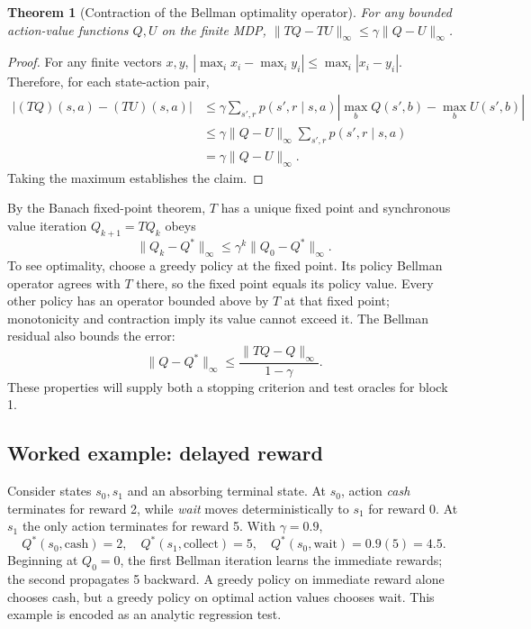 \documentclass[11pt,a4paper]{article}
\newtheorem{theorem}{Theorem}
\begin{document}
\begin{theorem}[Contraction of the Bellman optimality operator]
For any bounded action-value functions $Q,U$ on the finite MDP, $\|TQ-TU\|_\infty\leq\gamma\|Q-U\|_\infty$.
\end{theorem}
\begin{proof}
For any finite vectors $x,y$, $|\max_i x_i-\max_i y_i|\leq\max_i|x_i-y_i|$. Therefore, for each state-action pair,
\begin{align*}
 |(TQ)(s,a)-(TU)(s,a)|
 &\leq\gamma\sum_{s',r}p(s',r\mid s,a)\left|\max_bQ(s',b)-\max_bU(s',b)\right|\\
 &\leq\gamma\|Q-U\|_\infty\sum_{s',r}p(s',r\mid s,a)\\
 &=\gamma\|Q-U\|_\infty.
\end{align*}
Taking the maximum establishes the claim.
\end{proof}
By the Banach fixed-point theorem, $T$ has a unique fixed point and synchronous value iteration $Q_{k+1}=TQ_k$ obeys
\[
 \|Q_k-Q^*\|_\infty\leq\gamma^k\|Q_0-Q^*\|_\infty.
\]
To see optimality, choose a greedy policy at the fixed point. Its policy Bellman operator agrees with $T$ there, so the fixed point equals its policy value. Every other policy has an operator bounded above by $T$ at that fixed point; monotonicity and contraction imply its value cannot exceed it. The Bellman residual also bounds the error:
\[
 \|Q-Q^*\|_\infty\leq\frac{\|TQ-Q\|_\infty}{1-\gamma}.
\]
These properties will supply both a stopping criterion and test oracles for block 1.

\subsection{Worked example: delayed reward}
Consider states $s_0,s_1$ and an absorbing terminal state. At $s_0$, action \emph{cash} terminates for reward 2, while \emph{wait} moves deterministically to $s_1$ for reward 0. At $s_1$ the only action terminates for reward 5. With $\gamma=0.9$,
\[
 Q^*(s_0,\text{cash})=2,\quad Q^*(s_1,\text{collect})=5,\quad
 Q^*(s_0,\text{wait})=0.9(5)=4.5.
\]
Beginning at $Q_0=0$, the first Bellman iteration learns the immediate rewards; the second propagates 5 backward. A greedy policy on immediate reward alone chooses cash, but a greedy policy on optimal action values chooses wait. This example is encoded as an analytic regression test.
\end{document}
